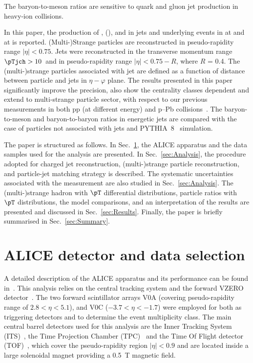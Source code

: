 \documentclass[ALICE,manyauthors]{cernphprep}
\begin{document}
The baryon-to-meson ratios are sensitive to quark and gluon jet production in heavy-ion collisions.

In this paper, the production of \kzero, \lmb (\almb), \Xis and \Oms in jets and underlying events in \pp at \thirteen and \pPb at \fivenn is reported.
(Multi-)Strange particles are reconstructed in pseudo-rapidity range $|\eta| < 0.75$.
Jets were reconstructed in the transverse momentum range $\pTjch > 10$~\GeVc and in pseudo-rapidity range $|\eta| < 0.75 - R$, where $R$ = 0.4.
The (multi-)strange particles associated with jet are defined as a function of distance between particle and jets in $\eta-\varphi$ plane.
The results presented in this paper significantly improve the precision, also show the centrality classes dependent and extend to multi-strange particle sector, with respect to our previous measurements in both pp (at different energy) and p–Pb collisions~\cite{Acharya:2021oaa}.
The baryon-to-meson and baryon-to-baryon ratios in energetic jets are compared with the case of particles not associated with jets and PYTHIA~8~\cite{Sjostrand:2014zea} simulation.

The paper is structured as follows.
In Sec.~\ref{sec:Detector}, the ALICE apparatus and the data samples used for the analysis are presented. In Sec.~\ref{sec:Analysis}, the procedure adopted for charged jet reconstruction, (multi-)strange particle reconstruction, and particle-jet matching strategy is described.
The systematic uncertainties associated with the measurement are also studied in Sec.~\ref{sec:Analysis}.
The (multi-)strange hadron with $\pT$ differential distributions, particle ratios with $\pT$ distributions, the model comparisons, and an interpretation of the results are presented and discussed in Sec.~\ref{sec:Results}. Finally, the paper is briefly summarised in Sec.~\ref{sec:Summary}. 

\section{ALICE detector and data selection}%
\label{sec:Detector}

A detailed description of the ALICE apparatus and its performance can be found in~\cite{Collaboration_2008, Abelev:2014ffa}.
This analysis relies on the central tracking system and the forward VZERO detector~\cite{Abbas:2013taa}.
The two forward scintillator arrays V0A (covering pseudo-rapidity range of $2.8 < \eta < 5.1$), and V0C ($-3.7 < \eta < -1.7$) were employed for both as triggering detectors and to determine the event multiplicity class.
The main central barrel detectors used for this analysis are the Inner Tracking System (ITS)~\cite{Aamodt:2010aa}, the Time Projection Chamber (TPC)~\cite{Alme:2010ke} and the Time Of Flight detector (TOF)~\cite{Akindinov:2004cj, Akindinov:2009zze, Akindinov:2010zzb, Carnesecchi:2018oss}, which cover the pseudo-rapidity region $|\eta| < 0.9$ and are located inside a large solenoidal magnet providing a 0.5~T magnetic field.
\end{document}
